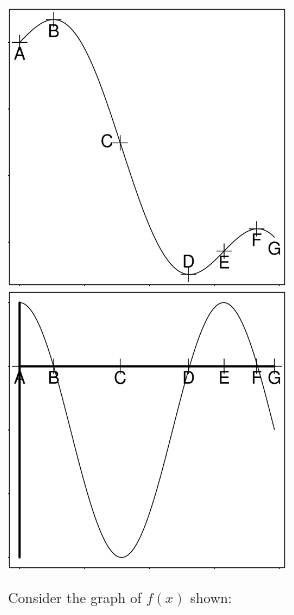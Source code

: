 \includegraphics[width=2.9in]{graphics/notes_01_incr_decr} \\[.1in]
\includegraphics[width=2.9in]{graphics/notes_01_incr_decr_deriv}

\newpage

\problem  Consider the graph of $f(x)$ shown:


